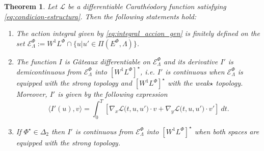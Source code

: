 \documentclass[twoside]{article}
\newtheorem{thm}{Theorem}[section]
\theoremstyle{remark}
\newcommand{\lphi}{L^{\Phi}}
\newcommand{\ephi}{E^{\Phi}}
\newcommand{\wphi}{W^{1}\lphi}
\newcommand{\domi}{\mathcal{E}^{\Phi}}
\begin{document}
\begin{thm}\label{teo:diferenciabilidad}
Let $\mathcal{L}$ be a differentiable Carath\'eodory function satisfying \eqref{eq:condicion-estructura}.
Then the following statements hold:
\begin{enumerate}
\item \label{it:T1item1} \label{A1} The action integral given by \eqref{eq:integral_accion_gen}
is finitely defined on the set $\domi_{\Lambda}:=W^{1}\lphi\cap\{u|u'\in\Pi(\ephi,\Lambda)\}$.

\item\label{it:T1item3} The function  $I$ is G\^ateaux differentiable on $\domi_{\Lambda}$ and  its derivative $I'$ is demicontinuous from 
$\domi_{\Lambda}$  into $\left[\wphi \right]^{\star}$, i.e. $I'$ is continuous when $\domi_{\Lambda}$ is equipped with the strong topology and   $\left[\wphi \right]^{\star}$ with the weak${\star}$ topology. Moreover, $I'$ is given by the following expression
\begin{equation}\label{eq:DerAccion}
\langle  I'(u),v\rangle= \int_0^T \left[\nabla_x\mathcal{L}\big(t,u,u'\big)\cdot v
+ \nabla_y\mathcal{L}\big(t,u,u'\big)\cdot v'\right] \ dt.
\end{equation}

\item\label{it:T1item4}  If  $\Phi^{\star} \in \Delta_2$ then 
  $I'$ is continuous from $\domi_{\Lambda}$ into $\left[\wphi\right]^{\star}$ when both spaces are equipped with the strong topology.
\end{enumerate}
\end{thm}
\end{document}
